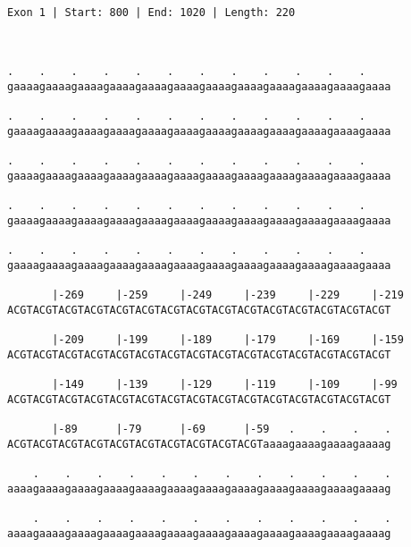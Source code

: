 \documentclass{article}
\begin{document}
 \begin{Verbatim}
 
Exon 1 | Start: 800 | End: 1020 | Length: 220



.    .    .    .    .    .    .    .    .    .    .    .    
gaaaagaaaagaaaagaaaagaaaagaaaagaaaagaaaagaaaagaaaagaaaagaaaa
                                                            
.    .    .    .    .    .    .    .    .    .    .    .    
gaaaagaaaagaaaagaaaagaaaagaaaagaaaagaaaagaaaagaaaagaaaagaaaa
                                                            
.    .    .    .    .    .    .    .    .    .    .    .    
gaaaagaaaagaaaagaaaagaaaagaaaagaaaagaaaagaaaagaaaagaaaagaaaa
                                                            
.    .    .    .    .    .    .    .    .    .    .    .    
gaaaagaaaagaaaagaaaagaaaagaaaagaaaagaaaagaaaagaaaagaaaagaaaa
                                                            
.    .    .    .    .    .    .    .    .    .    .    .    
gaaaagaaaagaaaagaaaagaaaagaaaagaaaagaaaagaaaagaaaagaaaagaaaa
                                                            
       |-269     |-259     |-249     |-239     |-229     |-219
ACGTACGTACGTACGTACGTACGTACGTACGTACGTACGTACGTACGTACGTACGTACGT
                                                            
       |-209     |-199     |-189     |-179     |-169     |-159
ACGTACGTACGTACGTACGTACGTACGTACGTACGTACGTACGTACGTACGTACGTACGT
                                                            
       |-149     |-139     |-129     |-119     |-109     |-99
ACGTACGTACGTACGTACGTACGTACGTACGTACGTACGTACGTACGTACGTACGTACGT
                                                            
       |-89      |-79      |-69      |-59   .    .    .    .
ACGTACGTACGTACGTACGTACGTACGTACGTACGTACGTaaaagaaaagaaaagaaaag
                                                            
    .    .    .    .    .    .    .    .    .    .    .    .
aaaagaaaagaaaagaaaagaaaagaaaagaaaagaaaagaaaagaaaagaaaagaaaag
                                                            
    .    .    .    .    .    .    .    .    .    .    .    .
aaaagaaaagaaaagaaaagaaaagaaaagaaaagaaaagaaaagaaaagaaaagaaaag
                                                            

\end{Verbatim}
\end{document}
